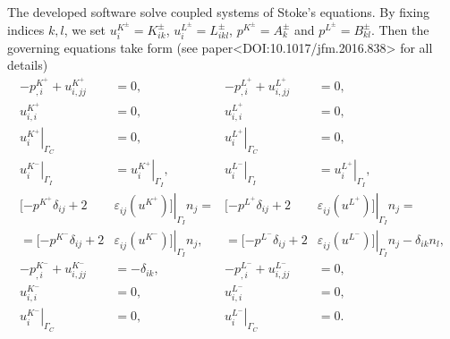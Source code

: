 \documentclass[12pt,a4paper]{article}
\newcommand{\str}[3]{\varepsilon^{#1}_{#2} \left( #3 \right)}
\begin{document}
The developed software solve coupled systems of Stoke's equations. By fixing indices $k,l$, we set $u_i^{K^{\pm}} = K^{\pm}_{ik}$, $u_i^{L^{\pm}} = L^{\pm}_{ikl}$, $p^{K^{\pm}} = A^{\pm}_{k}$ and $p^{L^{\pm}} = B^{\pm}_{kl}$. Then the governing equations take form (see paper<DOI:10.1017/jfm.2016.838> for all details)
\begin{align}
- p^{K^{+}}_{,i} + u^{K^{+}}_{i,jj} & = 0, &  - p^{L^{+}}_{,i} + u^{L^{+}}_{i,jj} & = 0, \\
u^{K^{+}}_{i,i} & = 0, & u^{L^{+}}_{i,i} & = 0 , \\
\left. u^{K^{+}}_{i} \right|_{\Gamma_C} & = 0, & \left. u^{L^{+}}_{i} \right|_{\Gamma_C} & = 0, \\
\left. u^{K^{-}}_{i} \right|_{\Gamma_I} & = \left. u^{K^{+}}_{i} \right|_{\Gamma_I}, &  \left. u^{L^{-}}_{i} \right|_{\Gamma_I} & = \left. u^{L^{+}}_{i} \right|_{\Gamma_I},  \\
[ - p^{K^{+}} \delta_{ij} + 2 & \left. \str{}{ij}{u^{K^{+}}} ] \right|_{\Gamma_I} n_j = &  [ - p^{L^{+}} \delta_{ij} + 2 & \left. \str{}{ij}{u^{L^{+}}} ] \right|_{\Gamma_I} n_j = \\
= [ - p^{K^{-}} \delta_{ij} + 2 & \left. \str{}{ij}{u^{K^{-}}} ] \right|_{\Gamma_I} n_j,  &  = [ - p^{L^{-}} \delta_{ij} + 2 & \left. \str{}{ij}{u^{L^{-}}} ] \right|_{\Gamma_I} n_j - \delta_{ik} n_l,  \\
- p^{K^{-}}_{,i} + u^{K^{-}}_{i,jj} & = - \delta_{ik},  & - p^{L^{-}}_{,i} + u^{L^{-}}_{i,jj} & = 0,  \\
u^{K^{-}}_{i,i} & = 0, & u^{L^{-}}_{i,i} & = 0, \\
\left. u^{K^{-}}_{i} \right|_{\Gamma_C} & = 0, & \left. u^{L^{-}}_{i} \right|_{\Gamma_C} & = 0.
\end{align}
\end{document}
